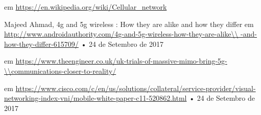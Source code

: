 \documentclass{llncs}
\begin{document}
\begin{thebibliography}{11}
 em \url{https://en.wikipedia.org/wiki/Cellular_network}

Majeed Ahmad,
4g and 5g wireless : How they are alike and how they differ
em \url{http://www.androidauthority.com/4g-and-5g-wireless-how-they-are-alike\\
-and-how-they-differ-615709/}
• 24 de Setembro de 2017

em \url{https://www.theengineer.co.uk/uk-trials-of-massive-mimo-bring-5g-\\communications-closer-to-reality/}

em \url{https://www.cisco.com/c/en/us/solutions/collateral/service-provider/visual-networking-index-vni/mobile-white-paper-c11-520862.html}
• 24 de Setembro de 2017
\end{thebibliography}
\end{document}
